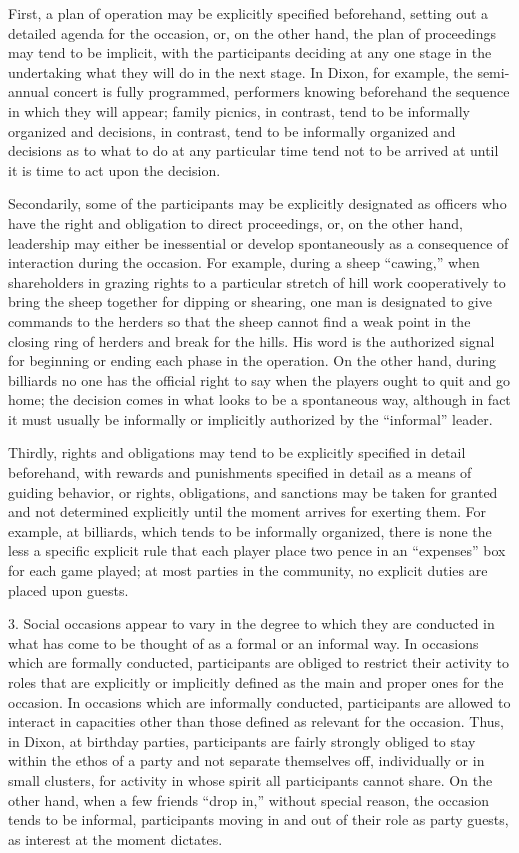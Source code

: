 \documentclass[openany,nobib]{tufte-book}
\begin{document}
First, a plan of operation may be explicitly specified beforehand,
setting out a detailed agenda for the occasion, or, on the other hand,
the plan of proceedings may tend to be implicit, with the participants
deciding at any one stage in the undertaking what they will do in the
next stage. In Dixon, for example, the semi-annual concert is fully
programmed, performers knowing beforehand the sequence in which they
will appear; family picnics, in contrast, tend to be informally
organized and decisions, in contrast, tend to be informally organized
and decisions as to what to do at any particular time tend not to be
arrived at until it is time to act upon the decision.

Secondarily, some of the participants may be explicitly designated as
officers who have the right and obligation to direct proceedings, or, on
the other hand, leadership may either be inessential or develop
spontaneously as a consequence of interaction during the occasion. For
example, during a sheep ``cawing,'' when shareholders in grazing rights
to a particular stretch of hill work cooperatively to bring the sheep
together for dipping or shearing, one man is designated to give commands
to the herders so that the sheep cannot find a weak point in the closing
ring of herders and break for the hills. His word is the authorized
signal for beginning or ending each phase in the operation. On the other
hand, during billiards no one has the official right to say when the
players ought to quit and go home; the decision comes in what looks to
be a spontaneous way, although in fact it must usually be informally or
implicitly authorized by the ``informal'' leader.

Thirdly, rights and obligations may tend to be explicitly specified in
detail beforehand, with rewards and punishments specified in detail as a
means of guiding behavior, or rights, obligations, and sanctions may be
taken for granted and not determined explicitly until the moment arrives
for exerting them. For example, at billiards, which tends to be
informally organized, there is none the less a specific explicit rule
that each player place two pence in an ``expenses'' box for each game
played; at most parties in the community, no explicit duties are placed
upon guests.

3. Social occasions appear to vary in the degree to which they are
conducted in what has come to be thought of as a formal or an informal
way. In occasions which are formally conducted, participants are obliged
to restrict their activity to roles that are explicitly or implicitly
defined as the main and proper ones for the occasion. In occasions which
are informally conducted, participants are allowed to interact in
capacities other than those defined as relevant for the occasion. Thus,
in Dixon, at birthday parties, participants are fairly strongly obliged
to stay within the ethos of a party and not separate themselves off,
individually or in small clusters, for activity in whose spirit all
participants cannot share. On the other hand, when a few friends ``drop
in,'' without special reason, the occasion tends to be informal,
participants moving in and out of their role as party guests, as
interest at the moment dictates.
\end{document}
